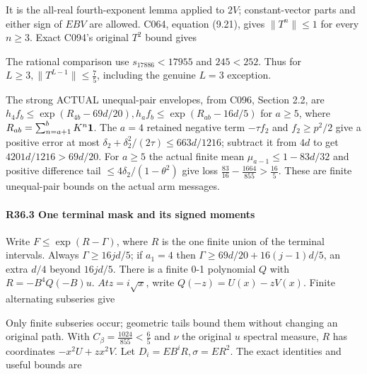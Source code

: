 It is the all-real fourth-exponent lemma applied to \(2V\); constant-vector parts and either sign of \(EBV\) are allowed.  C064, equation (9.21), gives \(\lVert T^n\rVert \le 1\) for every \(n\ge 3\). Exact C094's original \(T^2\) bound gives


The rational comparison use \(s_{17886}<17955\) and \(245<252\). Thus for \(L\ge 3,\allowbreak \allowbreak  \lVert T^{L-1}\rVert \le \frac{7}{5}\), including the genuine \(L=3\) exception.

The strong ACTUAL unequal-pair envelopes, from C096, Section 2.2, are \(h_{4} f_b\le \exp(R_{4b}-69d/20),\allowbreak \allowbreak  h_a f_b\le \exp(R_{ab}-16d/5)\) for \(a\ge 5\), where \(R_{ab}=\sum_{n=a+1}^{b}K^n\mathbf1\). The \(a=4\) retained negative term \(-\tau f_{2}\) and \(f_{2}\ge p^2/2\) give a positive error at most \(\delta_2+\delta_2^2/(2\tau)\le 663d/1216\); subtract it from \(4d\) to get \(4201d/1216>69d/20\). For \(a\ge 5\) the actual finite mean \(\mu_{a-1}\le 1-83d/32\) and positive difference tail \(\le 4\delta_2/(1-\theta^2)\) give loss \(\frac{83}{16}-\frac{1664}{855}>\frac{16}{5}\). These are finite unequal-pair bounds on the actual arm messages.

\paragraph{R36.3 One terminal mask and its signed moments}

Write \(F\le \exp(R-\Gamma)\), where \(R\) is the one finite union of the terminal intervals. Always \(\Gamma\ge 16jd/5\); if \(a_{1}=4\) then \(\Gamma\ge 69d/20+16(j-1)d/5\), an extra \(d/4\) beyond \(16jd/5\). There is a finite 0-1 polynomial \(Q\) with \(R=-B^4 Q(-B)u\). \(At z=i \sqrt{x}\), write \(Q(-z)=U(x)-zV(x)\). Finite alternating subseries give


Only finite subseries occur; geometric tails bound them without changing an original path. With \(C_\beta=\frac{1024}{855}<\frac{6}{5}\) and \(\nu\) the original \(u\) spectral measure, \(R\) has coordinates \(-x^2U+z x^2V\). Let \(D_i=EB^iR,\allowbreak \allowbreak  \sigma=ER^2\). The exact identities and useful bounds are

